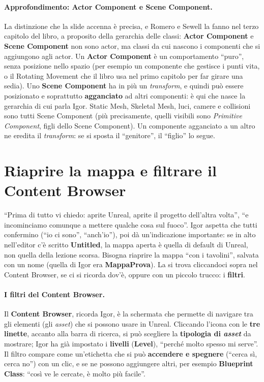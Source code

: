 \paragraph{Approfondimento: Actor Component e Scene Component.} La distinzione che la
slide accenna è precisa, e Romero e Sewell la fanno nel terzo capitolo del libro, a
proposito della gerarchia delle classi: \textbf{Actor Component} e \textbf{Scene
Component} non sono actor, ma classi da cui nascono i componenti che si aggiungono agli
actor. Un \textbf{Actor Component} è un comportamento ``puro'', senza posizione nello
spazio (per esempio un componente che gestisce i punti vita, o il Rotating Movement che
il libro usa nel primo capitolo per far girare una sedia). Uno \textbf{Scene Component}
ha in più un \emph{transform}, e quindi può essere posizionato e soprattutto
\textbf{agganciato} ad altri componenti: è qui che nasce la gerarchia di cui parla
Igor. Static Mesh, Skeletal Mesh, luci, camere e collisioni sono tutti Scene Component
(più precisamente, quelli visibili sono \emph{Primitive Component}, figli dello Scene
Component). Un componente agganciato a un altro ne eredita il \emph{transform}: se si
sposta il ``genitore'', il ``figlio'' lo segue.

\section{Riaprire la mappa e filtrare il Content Browser}
\label{ue2:sec:filtri}

``Prima di tutto vi chiedo: aprite Unreal, aprite il progetto dell'altra volta'', ``e
incominciamo comunque a mettere qualche cosa sul fuoco''. Igor aspetta che tutti
confermino (``io ci sono'', ``anch'io''), poi dà un'indicazione importante: se in alto
nell'editor c'è scritto \textbf{Untitled}, la mappa aperta è quella di default di
Unreal, non quella della lezione scorsa. Bisogna riaprire la mappa ``con i tavolini'',
salvata con un nome (quella di Igor era \textbf{MappaProva}). La si trova cliccandoci
sopra nel Content Browser, se ci si ricorda dov'è, oppure con un piccolo trucco: i
\textbf{filtri}.

\paragraph{I filtri del Content Browser.} Il \textbf{Content Browser}, ricorda Igor, è la
schermata che permette di navigare tra gli elementi (gli \emph{asset}) che si possono
usare in Unreal. Cliccando l'icona con le \textbf{tre linette}, accanto alla barra di
ricerca, si può scegliere la \textbf{tipologia di \emph{asset}} da mostrare; Igor ha già
impostato i \textbf{livelli} (\textbf{Level}), ``perché molto spesso mi serve''. Il
filtro compare come un'etichetta che si può \textbf{accendere e spegnere} (``cerca sì,
cerca no'') con un clic, e se ne possono aggiungere altri, per esempio
\textbf{Blueprint Class}: ``così ve le cercate, è molto più facile''.


